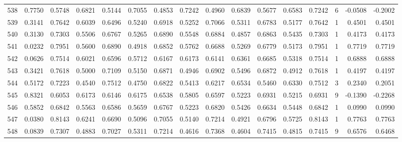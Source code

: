 \begin{tabular}{lrrrrrrrrrrrrrrr}
538 &      0.7750 &  0.5748 &  0.6821 &  0.5144 &  0.7055 &  0.4853 &  0.7242 &  0.4960 &  0.6839 &  0.5677 &   0.6583 &     0.7242 &      6 &                   -0.0508 &                    -0.2002 \\
539 &      0.3141 &  0.7642 &  0.6039 &  0.6496 &  0.5240 &  0.6918 &  0.5252 &  0.7066 &  0.5311 &  0.6783 &   0.5177 &     0.7642 &      1 &                    0.4501 &                     0.4501 \\
540 &      0.3130 &  0.7303 &  0.5506 &  0.6767 &  0.5265 &  0.6890 &  0.5548 &  0.6884 &  0.4857 &  0.6863 &   0.5435 &     0.7303 &      1 &                    0.4173 &                     0.4173 \\
541 &      0.0232 &  0.7951 &  0.5600 &  0.6890 &  0.4918 &  0.6852 &  0.5762 &  0.6688 &  0.5269 &  0.6779 &   0.5173 &     0.7951 &      1 &                    0.7719 &                     0.7719 \\
542 &      0.0626 &  0.7514 &  0.6021 &  0.6596 &  0.5712 &  0.6167 &  0.6173 &  0.6141 &  0.6361 &  0.6685 &   0.5318 &     0.7514 &      1 &                    0.6888 &                     0.6888 \\
543 &      0.3421 &  0.7618 &  0.5000 &  0.7109 &  0.5150 &  0.6871 &  0.4946 &  0.6902 &  0.5496 &  0.6872 &   0.4912 &     0.7618 &      1 &                    0.4197 &                     0.4197 \\
544 &      0.5172 &  0.7223 &  0.4540 &  0.7512 &  0.4750 &  0.6822 &  0.5413 &  0.6217 &  0.6534 &  0.5460 &   0.6330 &     0.7512 &      3 &                    0.2340 &                     0.2051 \\
545 &      0.8321 &  0.6053 &  0.6173 &  0.6146 &  0.6175 &  0.6538 &  0.5805 &  0.6597 &  0.5223 &  0.6931 &   0.5215 &     0.6931 &      9 &                   -0.1390 &                    -0.2268 \\
546 &      0.5852 &  0.6842 &  0.5563 &  0.6586 &  0.5659 &  0.6767 &  0.5223 &  0.6820 &  0.5426 &  0.6634 &   0.5448 &     0.6842 &      1 &                    0.0990 &                     0.0990 \\
547 &      0.0380 &  0.8143 &  0.6241 &  0.6690 &  0.5096 &  0.7055 &  0.5140 &  0.7214 &  0.4921 &  0.6796 &   0.5725 &     0.8143 &      1 &                    0.7763 &                     0.7763 \\
548 &      0.0839 &  0.7307 &  0.4883 &  0.7027 &  0.5311 &  0.7214 &  0.4616 &  0.7368 &  0.4604 &  0.7415 &   0.4815 &     0.7415 &      9 &                    0.6576 &                     0.6468 \\

\end{tabular}
